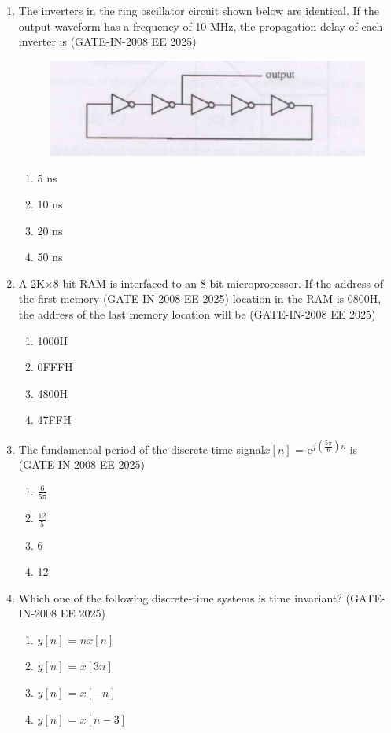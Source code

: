 \documentclass[journal,12pt,onecolumn]{IEEEtran}
\theoremstyle{remark}
\begin{document}
\begin{enumerate}[label=Q.\arabic*,start=1]
    \item The inverters in the ring oscillator circuit shown below are identical. If the output waveform has a
frequency of 10 MHz, the propagation delay of each inverter is (GATE-IN-2008 EE 2025)
\begin{figure}[H]
    \centering
    \includegraphics[width=0.5\linewidth]{figs/i4.jpg}
    \label{fig:placeholder4}
\end{figure}
    \begin{enumerate} 
        \item 5 ns
        \item 10 ns
        \item 20 ns
        \item 50 ns
    \end{enumerate}
    
    \item A 2K$\times$8 bit RAM is interfaced to an 8-bit microprocessor. If the address of the first memory (GATE-IN-2008 EE 2025)
location in the RAM is 0800H, the address of the last memory location will be (GATE-IN-2008 EE 2025)
    \begin{enumerate} 
        \item 1000H
        \item 0FFFH
        \item 4800H 
        \item 47FFH
    \end{enumerate}
    
    \item  The fundamental period of the discrete-time signal$x[n]$ = e\textsuperscript{$j(\frac{5\pi}{6})n$} is  (GATE-IN-2008 EE 2025)
    \begin{enumerate} 
        \item $\frac{6}{5\pi}$
        \item $\frac{12}{5}$
        \item 6
        \item 12
    \end{enumerate}
    
    \item  Which one of the following discrete-time systems is time invariant? (GATE-IN-2008 EE 2025)
    \begin{enumerate} 
        \item $y[n]$ = $nx[n]$
        \item $y[n]$ = $x[3n]$
        \item $y[n]$ = $x[-n]$
        \item $y[n]$ = $x[n-3]$
    \end{enumerate}
    

\end{enumerate}
\end{document}
